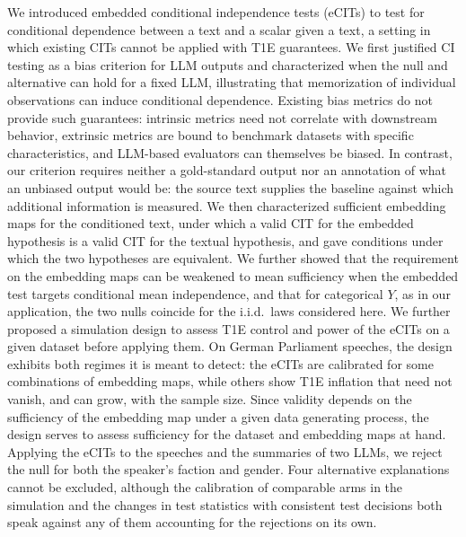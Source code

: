 \documentclass[twoside,11pt]{article}
\begin{document}
We introduced embedded conditional independence tests (eCITs) to test for conditional dependence between a text and a scalar given a text, a setting in which existing CITs cannot be applied with T1E guarantees.
We first justified CI testing as a bias criterion for LLM outputs and characterized when the null and alternative can hold for a fixed LLM, illustrating that memorization of individual observations can induce conditional dependence. Existing bias metrics do not provide such guarantees: intrinsic metrics need not correlate with downstream behavior, extrinsic metrics are bound to benchmark datasets with specific characteristics, and LLM-based evaluators can themselves be biased. In contrast, our criterion requires neither a gold-standard output nor an annotation of what an unbiased output would be: the source text supplies the baseline against which additional information is measured.
We then characterized sufficient embedding maps for the conditioned text, under which a valid CIT for the embedded hypothesis is a valid CIT for the textual hypothesis, and gave conditions under which the two hypotheses are equivalent. We further showed that the requirement on the embedding maps can be weakened to mean sufficiency when the embedded test targets conditional mean independence, and that for categorical $Y$, as in our application, the two nulls coincide for the i.i.d.\ laws considered here.
We further proposed a simulation design to assess T1E control and power of the eCITs on a given dataset before applying them. On German Parliament speeches, the design exhibits both regimes it is meant to detect: the eCITs are calibrated for some combinations of embedding maps, while others show T1E inflation that need not vanish, and can grow, with the sample size. Since validity depends on the sufficiency of the embedding map under a given data generating process, the design serves to assess sufficiency for the dataset and embedding maps at hand.
Applying the eCITs to the speeches and the summaries of two LLMs, we reject the null for both the speaker's faction and gender. Four alternative explanations cannot be excluded, %
although %
the calibration of comparable arms in the simulation and the changes in test statistics with consistent test decisions both speak against any of them accounting for the rejections on its own.
\end{document}
